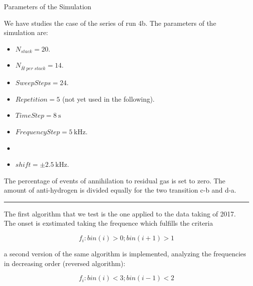 \documentclass[8pt]{beamer}
\begin{document}
\begin{frame}{Parameters of the Simulation}

We have studies the case of the series of run 4b. The parameters of the simulation are:
\begin{itemize}
\item $N_{stack} = 20$.
\item $N_{\overline{H} \; per \; stack} = 14$.
\item $SweepSteps = 24$.
\item $Repetition = 5$ (not yet used in the following).
\item $TimeStep = \SI{8}{\second}$
\item $FrequencyStep = \SI{5}{\kilo \hertz}$.
\item {}
\item $shift = \pm \SI{2.5}{\kilo \hertz}$.
\end{itemize}

The percentage of events of annihilation to residual gas is set to zero. The amount of anti-hydrogen is divided equally for the two transition c-b and d-a.
\vspace{2pt}
\hrule 
\vspace{2pt}
The first algorithm that we test is the one applied to the data taking of 2017. The onset is exstimated taking the frequence which fulfills the criteria

\begin{equation}
f_{i} : bin(i) > 0; bin(i + 1) > 1
\end{equation}

a second version of the same algorithm is implemented, analyzing the frequencies in decreasing order (reversed algorithm):

\begin{equation*}
f_{i} : bin(i) < 3; bin(i - 1) < 2
\end{equation*}

\end{frame}
\end{document}
